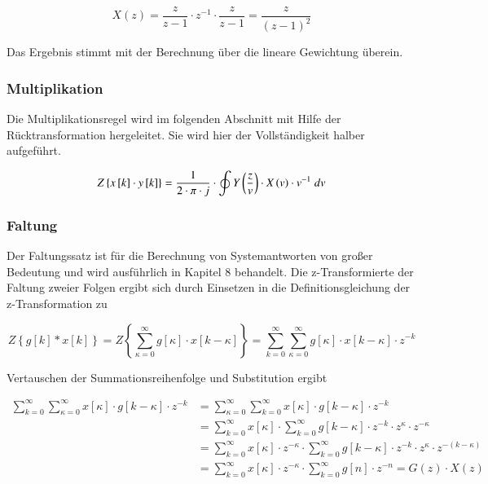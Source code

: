 \begin{equation}\label{eq:fivesixtyseven}
X\left(z\right)=\frac{z}{z-1} \cdot z^{-1} \cdot \frac{z}{z-1} =\frac{z}{\left(z-1\right)^{2} }
\end{equation}

\noindent Das Ergebnis stimmt mit der Berechnung \"{u}ber die lineare Gewichtung \"{u}berein. 

\subsubsection{Multiplikation}

\noindent Die Multiplikationsregel wird im folgenden Abschnitt mit Hilfe der R\"{u}cktransformation hergeleitet. Sie wird hier der Vollst\"{a}ndigkeit halber aufgef\"{u}hrt.

\begin{equation}\label{eq:fivesixtyeight}
Z\left\{x\left[k\right]\cdot y\left[k\right]\right\}=\frac{1}{2\cdot \pi \cdot j} \cdot \oint Y\left(\frac{z}{v} \right)\cdot X\left(v\right)\cdot v^{-1} {\rm \; }dv
\end{equation}

\subsubsection{Faltung}

\noindent Der Faltungssatz ist f\"{u}r die Berechnung von Systemantworten von gro{\ss}er Bedeutung und wird ausf\"{u}hrlich in Kapitel 8 behandelt. Die z-Transformierte der Faltung zweier Folgen ergibt sich durch Einsetzen in die Definitionsgleichung der z-Transformation zu

\begin{equation}\label{eq:fivesixtynine}
Z\left\{g\left[k\right]*x\left[k\right]\right\}=Z\left\{\sum _{\kappa =0}^{\infty }g\left[\kappa \right]\cdot x\left[k-\kappa \right] \right\}=\sum _{k=0}^{\infty }\sum _{\kappa =0}^{\infty }g\left[\kappa \right]\cdot x\left[k-\kappa \right]  \cdot z^{-k} 
\end{equation}

\noindent Vertauschen der Summationsreihenfolge und Substitution ergibt

\begin{equation}\label{eq:fiveseventy}
\begin{split}
\sum _{k=0}^{\infty }\sum _{\kappa =0}^{\infty }x\left[\kappa \right]\cdot g\left[k-\kappa \right]  \cdot z^{-k} &= \sum _{\kappa =0}^{\infty }\sum _{k=0}^{\infty }x\left[\kappa \right]\cdot g\left[k-\kappa \right]  \cdot z^{-k}\\
&= \sum _{k=0}^{\infty }x\left[\kappa \right]\cdot \sum _{k=0}^{\infty } g\left[k-\kappa \right] \cdot z^{-k} \cdot z^{\kappa} \cdot z^{-\kappa} \\
&= \sum _{k=0}^{\infty }x\left[\kappa \right]\cdot z^{-\kappa}\cdot \sum _{k=0}^{\infty } g\left[k-\kappa \right] \cdot z^{-k} \cdot z^{\kappa} \cdot z^{-(k-\kappa)}\\
&= \sum _{k=0}^{\infty }x\left[\kappa \right]\cdot z^{-\kappa}\cdot \sum _{k=0}^{\infty } g\left[n\right] \cdot z^{-n} = G(z) \cdot X(z)
\end{split}
\end{equation}

